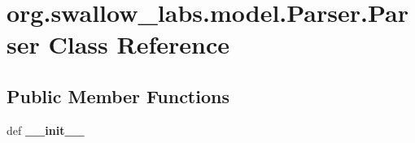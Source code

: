 \hypertarget{classorg_1_1swallow__labs_1_1model_1_1_parser_1_1_parser}{}\section{org.\+swallow\+\_\+labs.\+model.\+Parser.\+Parser Class Reference}
\label{classorg_1_1swallow__labs_1_1model_1_1_parser_1_1_parser}
\subsection*{Public Member Functions}
\begin{DoxyCompactItemize}
\item 
\hypertarget{classorg_1_1swallow__labs_1_1model_1_1_parser_1_1_parser_a7f52a8f83ce743be91c993ffe9e198da}{}def {\bfseries \+\_\+\+\_\+init\+\_\+\+\_\+}\label{classorg_1_1swallow__labs_1_1model_1_1_parser_1_1_parser_a7f52a8f83ce743be91c993ffe9e198da}

\end{DoxyCompactItemize}
